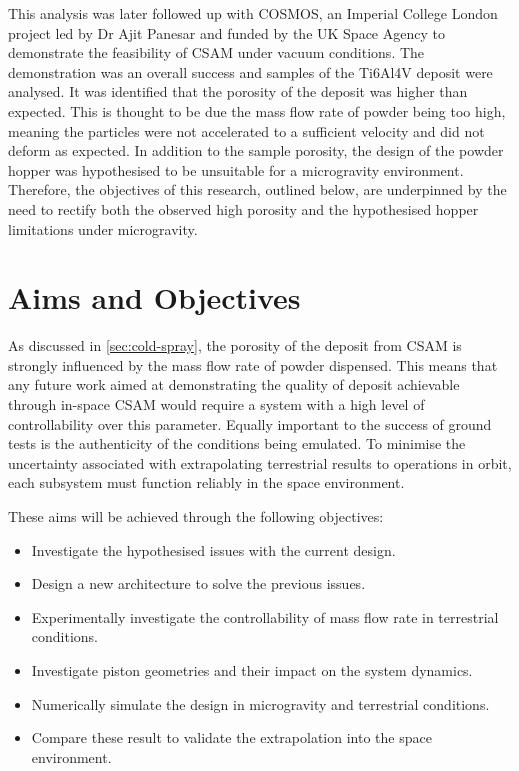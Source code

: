 This analysis was later followed up with COSMOS, an Imperial College London project led by Dr Ajit Panesar and funded by the UK Space Agency to demonstrate the feasibility of CSAM under vacuum conditions. The demonstration was an overall success and samples of the Ti6Al4V deposit were analysed. It was identified that the porosity of the deposit was higher than expected. This is thought to be due the mass flow rate of powder being too high, meaning the particles were not accelerated to a sufficient velocity and did not deform as expected. In addition to the sample porosity, the design of the powder hopper was hypothesised to be unsuitable for a microgravity environment. Therefore, the objectives of this research, outlined below, are underpinned by the need to rectify both the observed high porosity and the hypothesised hopper limitations under microgravity.

\section{Aims and Objectives}
As discussed in \autoref{sec:cold-spray}, the porosity of the deposit from CSAM is strongly influenced by the mass flow rate of powder dispensed. This means that any future work aimed at demonstrating the quality of deposit achievable through in-space CSAM would require a system with a high level of controllability over this parameter. Equally important to the success of ground tests is the authenticity of the conditions being emulated. To minimise the uncertainty associated with extrapolating terrestrial results to operations in orbit, each subsystem must function reliably in the space environment. 

These aims will be achieved through the following objectives:
\begin{itemize}
    \item Investigate the hypothesised issues with the current design.
    \item Design a new architecture to solve the previous issues.
    \item Experimentally investigate the controllability of mass flow rate in terrestrial conditions.
    \item Investigate piston geometries and their impact on the system dynamics.
    \item Numerically simulate the design in microgravity and terrestrial conditions.
    \item Compare these result to validate the extrapolation into the space environment. 
\end{itemize}


